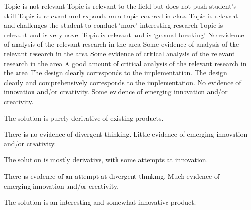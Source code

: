 \documentclass{../fal_assignment}
\begin{document}
\begin{markingrubric}
%
	\grade\fail Topic is not relevant
	\grade Topic is relevant to the field but does not push student's skill
	\grade Topic is relevant and expands on a topic covered in class
	\grade Topic is relevant and challenges the student to conduct `more' interesting research
	\grade Topic is relevant and is very novel
	\grade Topic is relevant and is `ground breaking'
%
%
        \grade\fail No evidence of analysis of the relevant research in the area
        \grade Some evidence of analysis of the relevant research in the area
        \grade Some evidence of critical analysis of the relevant research in the area
        \grade A good amount of critical analysis of the relevant research in the area
        \grade The design clearly corresponds to the implementation.
        \grade The design clearly and comprehensively corresponds to the implementation.
%
        \grade\fail No evidence of innovation and/or creativity.
        \grade Some evidence of emerging innovation and/or creativity.
            \par The solution is purely derivative of existing products.
            \par There is no evidence of divergent thinking.
        \grade Little evidence of emerging innovation and/or creativity.
            \par The solution is mostly derivative, with some attempts at innovation.
            \par There is evidence of an attempt at divergent thinking.
        \grade Much evidence of emerging innovation and/or creativity.
            \par The solution is an interesting and somewhat innovative product.

\end{markingrubric}
\end{document}

